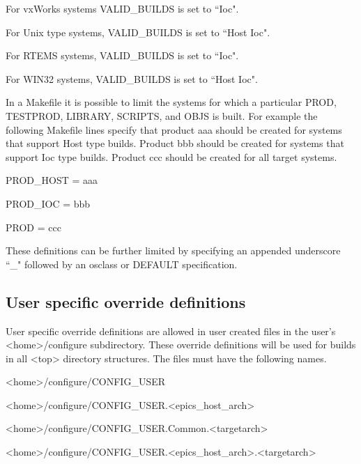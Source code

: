 For vxWorks systems VALID\_BUILDS is set to ``Ioc".

For Unix type systems, VALID\_BUILDS is set to ``Host Ioc".

For RTEMS systems, VALID\_BUILDS is set to ``Ioc".

For WIN32 systems, VALID\_BUILDS is set to ``Host Ioc".

In a Makefile it is possible to limit the systems for which a particular PROD, TESTPROD, LIBRARY, SCRIPTS, and 
OBJS is built. For example the following Makefile lines specify that product aaa should be created for systems that 
support Host type builds. Product bbb should be created for systems that support Ioc type builds. Product ccc should be 
created for all target systems.

\begin{description}\item PROD\_HOST = aaa

\item PROD\_IOC = bbb

\item PROD = ccc

\end{description}These definitions can be further limited by specifying an appended underscore ``\_" followed by an osclass or DEFAULT 
specification.

\subsection{User specific override definitions}

User specific override definitions are allowed in user created files in the user's \textless{}home\textgreater{}/configure subdirectory. These 
override definitions will be used for builds in all \textless{}top\textgreater{} directory structures. The files must have the following names. 

\textless{}home\textgreater{}/configure/CONFIG\_USER

\textless{}home\textgreater{}/configure/CONFIG\_USER.\textless{}epics\_host\_arch\textgreater{}

\textless{}home\textgreater{}/configure/CONFIG\_USER.Common.\textless{}targetarch\textgreater{}

\textless{}home\textgreater{}/configure/CONFIG\_USER.\textless{}epics\_host\_arch\textgreater{}.\textless{}targetarch\textgreater{}

